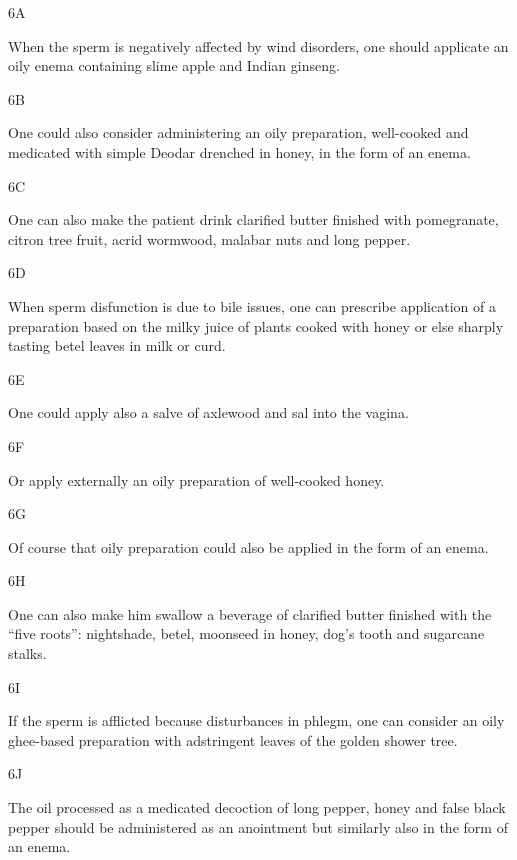 \begin{translation}
 \item[6A]
 
  When the sperm is negatively affected by wind disorders, one should applicate 
  an oily enema containing slime apple and Indian ginseng. 
 
 \item[6B]
 
  One could also consider administering an oily preparation, well-cooked and 
  medicated with simple Deodar drenched in honey, in the form of an enema. 
 
 \item[6C]
 
  One can also make the patient drink clarified butter finished with pomegranate, 
  citron tree fruit, acrid wormwood, malabar nuts and long pepper. 
 
 \item[6D]
 
   When sperm disfunction is due to bile issues, one can prescribe application of 
   a preparation based on the milky juice of plants cooked with honey or else 
   sharply tasting betel leaves in milk or curd.
 
 \item[6E]
 
  One could apply also a salve of axlewood and sal into the vagina.
 
 \item[6F]
 
  Or apply externally an oily preparation of well-cooked honey.
 
 \item[6G]
 
  Of course that oily preparation could also be applied in the form of an enema.
 
 \item[6H]
 
  One can also make him swallow a beverage of clarified butter finished with the 
  “five roots”: nightshade, betel, moonseed in honey, dog’s tooth and sugarcane 
  stalks. 
 
 \item[6I]
 
  If the sperm is afflicted because disturbances in phlegm, one can consider an 
  oily ghee-based preparation with adstringent leaves of the golden shower tree.
 
 \item[6J]
 
  The oil processed as a medicated decoction of long pepper, honey and false 
  black pepper should be administered as an anointment but similarly also in the 
  form of an enema. 
 

\end{translation}
